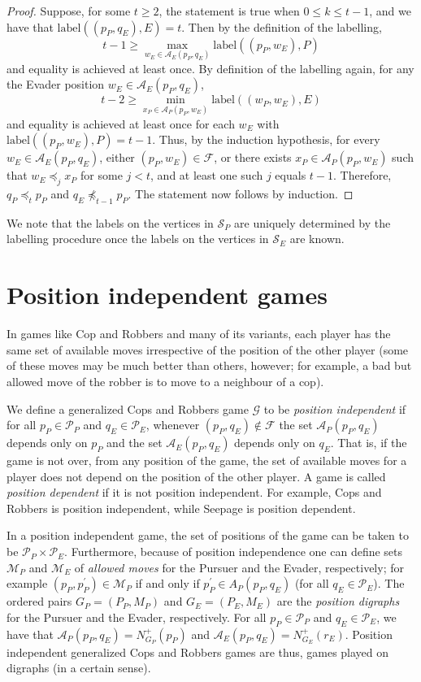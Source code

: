 \documentclass[12pt,reqno]{amsart}
\begin{document}
\begin{proof}
Suppose, for some $t \geq 2$, the statement is true when $ 0 \leq k \leq t-1$, and we have that $\mathrm{label}((p_P, q_E), E) = t$. Then by the definition of the labelling,
$$t-1 \geq \max_{w_E \in \mathcal{A}_E(p_P, q_E)}  \mathrm{label}((p_P, w_E) , P)$$
and equality is achieved at least once.
By definition of the labelling again, for any the Evader position $w_E \in \mathcal{A}_E(p_P, q_E)$,
$$t-2 \geq \min_{x_P \in \mathcal{A}_P(p_P, w_E)}  \mathrm{label}((w_P, w_E) , E)$$
and equality is achieved at least once for each $w_E$ with $\mathrm{label}((p_P, w_E) , P) = t-1$. Thus, by the induction hypothesis, for every $w_E \in \mathcal{A}_E(p_P, q_E)$, either $(p_P, w_E)
\in \mathcal{F}$, or there exists $x_P \in \mathcal{A}_P(p_P, w_E)$ such that $w_E \preceq_j x_P$ for some $j < t$, and at least one such $j$ equals $t-1$. Therefore, $q_P \preceq_{t} p_P$ and $q_E
\not\preceq_{t - 1} p_P$.  The statement now follows by induction.
\end{proof}
We note that the labels on the vertices in $\mathcal{S}_P$ are uniquely determined by the labelling procedure once the labels on the vertices in $\mathcal{S}_E$ are known.

\section{Position independent games}\label{pind}

In games like Cop and Robbers and many of its variants, each player has the same set of available moves irrespective of the position of the other player (some of these moves may be much better than
others, however; for example, a bad but allowed move of the robber is to move to a neighbour of a cop).

We define a generalized Cops and Robbers game $\mathcal{G}$ to be \emph{position independent} if for all $p_P \in \mathcal{P}_P$ and $q_E \in \mathcal{P}_E$, whenever $(p_P, q_E) \not\in \mathcal{F}$ the set $\mathcal{A}_P(p_P, q_E)$ depends only on $p_P$ and the set $\mathcal{A}_E(p_P, q_E)$ depends only on $q_E$.  That is, if the game is not over, from any position of the game, the set of
available moves for a player does not depend on the position of the other player. A game is called \emph{position dependent} if it is not position independent.   For example, Cops and Robbers is
position independent, while Seepage is position dependent.

In a position independent game, the set of positions of the game can be taken to be $\mathcal{P}_P \times \mathcal{P}_E$.  Furthermore, because of position independence one can define sets $\mathcal{M}_P$ and $\mathcal{M}_E$ of \emph{allowed moves} for the Pursuer and the Evader, respectively;  for example $(p_P, p^ \prime_P) \in \mathcal{M}_P$ if and only if $p^\prime_P \in A_P(p_P, q_E)$ (for all $q_E \in \mathcal{P}_E$). The ordered pairs $G_P = (P_P, M_P)$ and $G_E = (P_E, M_E)$ are the \emph{position digraphs} for the Pursuer and the Evader, respectively. For all $p_P \in \mathcal{P}_P$ and $q_E \in \mathcal{P}_E$, we have that $\mathcal{A}_P(p_P, q_E) = N^+_{G_P}(p_P)$ and $\mathcal{A}_E(p_P, q_E) = N^+_{G_E}(r_E)$. Position independent generalized Cops and Robbers
games are thus, games played on digraphs (in a certain sense).
\end{document}

